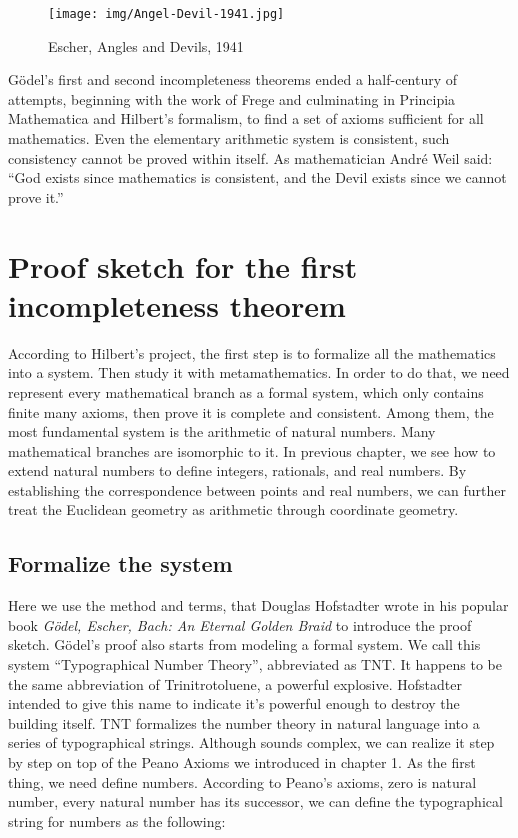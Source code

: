 \documentclass{article}
\begin{document}
\begin{figure}[htbp]
 \centering
 \texttt{[image: img/Angel-Devil-1941.jpg]}
 \caption{Escher, Angles and Devils, 1941}
 \label{fig:Angel-Devil-1941}
\end{figure}

Gödel's first and second incompleteness theorems ended a half-century of attempts, beginning with the work of Frege and culminating in Principia Mathematica and Hilbert's formalism, to find a set of axioms sufficient for all mathematics. Even the elementary arithmetic system is consistent, such consistency cannot be proved within itself. As mathematician André Weil said: ``God exists since mathematics is consistent, and the Devil exists since we cannot prove it.''\cite{HanXueTao16}

\section{Proof sketch for the first incompleteness theorem}

According to Hilbert's project, the first step is to formalize all the mathematics into a system. Then study it with metamathematics. In order to do that, we need represent every mathematical branch as a formal system, which only contains finite many axioms, then prove it is complete and consistent. Among them, the most fundamental system is the arithmetic of natural numbers. Many mathematical branches are isomorphic to it. In previous chapter, we see how to extend natural numbers to define integers, rationals, and real numbers. By establishing the correspondence between points and real numbers, we can further treat the Euclidean geometry as arithmetic through coordinate geometry.

\subsection{Formalize the system}
 
Here we use the method and terms, that Douglas Hofstadter wrote in his popular book {\em Gödel, Escher, Bach: An Eternal Golden Braid} to introduce the proof sketch. Gödel's proof also starts from modeling a formal system. We call this system ``Typographical Number Theory'', abbreviated as TNT. It happens to be the same abbreviation of Trinitrotoluene, a powerful explosive. Hofstadter intended to give this name to indicate it's powerful enough to destroy the building itself. TNT formalizes the number theory in natural language into a series of typographical strings. Although sounds complex, we can realize it step by step on top of the Peano Axioms we introduced in chapter 1. As the first thing, we need define numbers. According to Peano's axioms, zero is natural number, every natural number has its successor, we can define the typographical string for numbers as the following:
\end{document}
